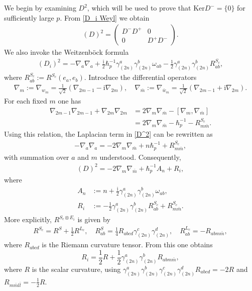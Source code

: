 \documentclass[12pt]{article}
\newcommand{\im}{\mathrm{i}}
\newcommand\eq[1]{\begin{equation}#1\end{equation}}
\theoremstyle{definition} %
\theoremstyle{plain} %
\theoremstyle{remark} %
\theoremstyle{underline}
\begin{document}
We begin by examining $D^2$, which will be used to prove that
$\mathrm{Ker} D^{-}=\{0\}$ for sufficiently large $p$.
From \eqref{D_i Weyl} we obtain
\begin{align}
    (D)^2 =
    \begin{pmatrix}
        D^{-} D^{+} & 0 \\
        0 & D^{+}D^{-}
    \end{pmatrix}.
    \label{d square 1}
\end{align}
We also invoke the Weitzenb\"ock formula
\begin{align}
    \label{D^2}
    (D_i)^2 = -\nabla_{a}\nabla_{a} +\frac{\im}{2}\hbar_p^{-1} \gamma^{a}_{(2n)}\gamma^{b}_{(2n)} \omega_{ab} - \frac{1}{2}\gamma^{a}_{(2n)}\gamma^{b}_{(2n)}R^{S_c}_{ab},
\end{align}
where $R^{S_c}_{ab} := R^{S_c}(e_a,e_b)$.
Introduce the differential operators
\begin{align}
    \nabla_m := \nabla_{w_m} = \frac{1}{\sqrt 2} (\nabla_{2m-1} - \im \nabla_{2m}), \quad
    \nabla_{\bar m} := \nabla_{\bar{w}_m} = \frac{1}{\sqrt 2} (\nabla_{2m-1} + \im \nabla_{2m}).
\end{align}
For each fixed $m$ one has
\begin{align}
    \nabla_{2m-1}\nabla_{2m-1} + \nabla_{2m}\nabla_{2m}
    &= 2\nabla_m \nabla_{\bar m} - [\nabla_m,\nabla_{\bar m}] \\
    &= 2\nabla_m \nabla_{\bar m} -\hbar_p^{-1} - R^{S_c}_{m\bar{m}}.
\end{align}
Using this relation, the Laplacian term in \eqref{D^2} can be rewritten as
\begin{align}
    -\nabla_{a}\nabla_{a} = -2 \nabla_m \nabla_{\bar m} +n \hbar_p^{-1} + R^{S_c}_{m\bar{m}},
\end{align}
with summation over $a$ and $m$ understood.
Consequently,
\begin{align}
    \label{D^2 n}
    (D)^2 = -2 \nabla_m \nabla_{\bar m} + \hbar_p^{-1} A_n + R_i,
\end{align}
where
\begin{align}
    A_n &:= n + \frac{\im}{2} \gamma^{a}_{(2n)}\gamma^{b}_{(2n)} \omega_{ab},\\
    R_i &:=  - \frac{1}{2}\gamma^{a}_{(2n)}\gamma^{b}_{(2n)}R^{S_c}_{ab} + R^{S_c}_{m\bar{m}}.
\end{align}
More explicitly, $R^{S_c \otimes E_i}$ is given by
\begin{align}
    R^{S_c} = R^S + \frac{1}{2}R^{L_c}, \quad  R^S_{ab} = \frac{1}{4} R_{abcd} \gamma_{(2n)}^c \gamma_{(2n)}^d, \quad  R^{L_c}_{ab} = - R_{ab m \bar{m}},
\end{align}
where $R_{abcd}$ is the Riemann curvature tensor.
From this one obtains
\eq{ \label{R_i}
R_i = \frac{1}{2} R + \frac{1}{2} \gamma_{(2n)}^a \gamma_{(2n)}^b R_{abm\bar{m}},}
where $R$ is the scalar curvature, using
$\gamma_{(2n)}^a \gamma_{(2n)}^b \gamma_{(2n)}^c \gamma_{(2n)}^d R_{abcd} = - 2 R$
and $R_{m \bar{m} l \bar{l}} = - \frac{1}{2}R$.
\end{document}

